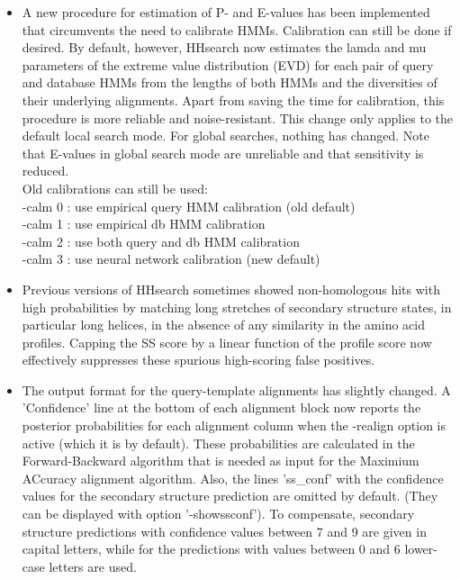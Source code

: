 \documentclass[11pt,a4paper]{article}
\begin{document}
\begin{itemize}
 
\item{A new procedure for estimation of P- and E-values has been implemented that
  circumvents the need to calibrate HMMs. Calibration can still be done if 
  desired. By default, however, HHsearch now estimates the lamda and mu 
  parameters of the extreme value distribution (EVD) for each pair of query 
  and database HMMs from the lengths of both HMMs and the diversities of their 
  underlying alignments. Apart from saving the time for calibration, this 
  procedure is more reliable and noise-resistant. This change only applies to 
  the default local search mode. For global searches, nothing has changed. Note
  that E-values in global search mode are unreliable and that sensitivity is 
  reduced. \\
  Old calibrations can still be used:\\
   -calm 0 : use empirical query HMM calibration (old default)\\
   -calm 1 : use empirical db HMM calibration\\
   -calm 2 : use both query and db HMM calibration\\
   -calm 3 : use neural network calibration (new default)
}

\item{Previous versions of HHsearch sometimes showed non-homologous hits with high 
  probabilities by matching long stretches of secondary structure states, 
  in particular long helices, in the absence of any similarity in the amino 
  acid profiles. Capping the SS score by a linear function of the profile score
  now effectively suppresses these spurious high-scoring false positives. 
}

\item{The output format for the query-template alignments has slightly changed.
  A 'Confidence' line at the bottom of each alignment block now reports the 
  posterior probabilities for each alignment column when the -realign option
  is active (which it is by default). These probabilities are calculated in the 
  Forward-Backward algorithm that is needed as input for the Maximium ACcuracy 
  alignment algorithm. Also, the lines 'ss\_conf' with the confidence values 
  for the secondary structure prediction are omitted by default. (They can  
  be displayed with option '-showssconf'). To compensate, secondary structure 
  predictions with confidence values between 7 and 9 are given in capital 
  letters, while for the predictions with values between 0 and 6 lower-case 
  letters are used. 
}


\end{itemize}
\end{document}
